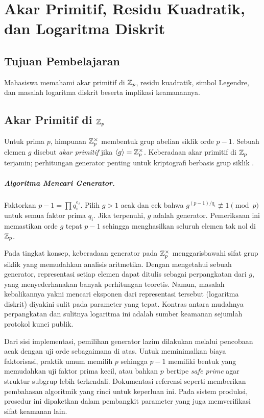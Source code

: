 \documentclass[../main.tex]{subfiles}
\begin{document}
\chapter{Akar Primitif, Residu Kuadratik, dan Logaritma Diskrit}

\section{Tujuan Pembelajaran}
Mahasiswa memahami akar primitif di \(\mathbb{Z}_p\), residu kuadratik, simbol Legendre, dan masalah logaritma diskrit beserta implikasi keamanannya.

\section{Akar Primitif di \(\mathbb{Z}_p\)}
Untuk prima \(p\), himpunan \(\mathbb{Z}_p^\times\) membentuk grup abelian siklik orde \(p-1\). Sebuah elemen \(g\) disebut \emph{akar primitif} jika \(\langle g\rangle = \mathbb{Z}_p^\times\). Keberadaan akar primitif di \(\mathbb{Z}_p\) terjamin; perhitungan generator penting untuk kriptografi berbasis grup siklik \citep{hoffstein}.

\paragraph{Algoritma Mencari Generator.} Faktorkan \(p-1=\prod q_i^{e_i}\). Pilih \(g>1\) acak dan cek bahwa \(g^{(p-1)/q_i}\not\equiv 1\pmod p\) untuk semua faktor prima \(q_i\). Jika terpenuhi, \(g\) adalah generator. Pemeriksaan ini memastikan orde \(g\) tepat \(p-1\) sehingga menghasilkan seluruh elemen tak nol di \(\mathbb{Z}_p\).

Pada tingkat konsep, keberadaan generator pada \(\mathbb{Z}_p^\times\) menggarisbawahi sifat grup siklik yang memudahkan analisis aritmetika. Dengan mengetahui sebuah generator, representasi setiap elemen dapat ditulis sebagai perpangkatan dari \(g\), yang menyederhanakan banyak perhitungan teoretis. Namun, masalah kebalikannya yakni mencari eksponen dari representasi tersebut (logaritma diskrit) diyakini sulit pada parameter yang tepat. Kontras antara mudahnya perpangkatan dan sulitnya logaritma ini adalah sumber keamanan sejumlah protokol kunci publik.

Dari sisi implementasi, pemilihan generator lazim dilakukan melalui pencobaan acak dengan uji orde sebagaimana di atas. Untuk meminimalkan biaya faktorisasi, praktik umum memilih \(p\) sehingga \(p-1\) memiliki bentuk yang memudahkan uji faktor prima kecil, atau bahkan \(p\) bertipe \emph{safe prime} agar struktur subgrup lebih terkendali. Dokumentasi referensi seperti \citep{shoup_nt} memberikan pembahasan algoritmik yang rinci untuk keperluan ini. Pada sistem produksi, prosedur ini dipaketkan dalam pembangkit parameter yang juga memverifikasi sifat keamanan lain.
\end{document}

